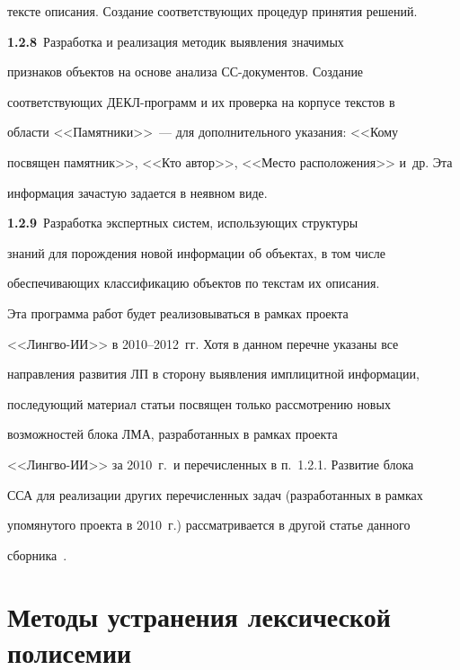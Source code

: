тексте описания. Создание соответствующих процедур принятия решений.  


   


   \textbf{1.2.8}\ Разработка и реализация методик выявления значимых 


признаков объектов на основе анализа СС-документов. Создание 


соответствующих ДЕКЛ-прог\-рамм и их проверка на корпусе текстов в 


области <<Памятники>>~--- для дополнительного указания: <<Кому 


посвящен памятник>>, <<Кто автор>>, <<Место расположения>> и~др. Эта 


информация зачастую задается в неявном виде.  


   


   \textbf{1.2.9}\ Разработка экспертных систем, использующих структуры 


знаний для порождения новой информации об объектах, в том числе 


обеспечивающих классификацию объектов по текстам их описания.





Эта программа работ будет реализовываться в рамках проекта 


<<Лингво-ИИ>> в 2010--2012~гг. Хотя в данном перечне указаны все 


направления развития ЛП в сторону выявления имплицитной информации, 


последующий материал статьи посвящен только рассмотрению новых 


возможностей блока ЛМА, разработанных в рамках проекта 


<<Лингво-ИИ>> за 2010~г.\ и перечисленных в п.~1.2.1. Развитие блока 


ССА для реализации других перечисленных задач (разработанных в рамках 


упомянутого проекта в 2010~г.) рассматривается в другой статье  данного 


сборника~\cite{12-2-9}.  





\vspace*{-6pt}


  


   \section{Методы устранения лексической полисемии}


